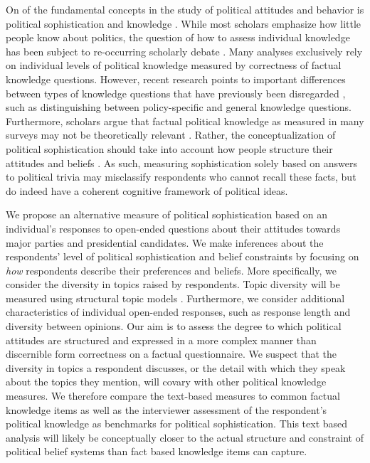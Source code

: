 \documentclass[12pt]{article}
\begin{document}
On of the fundamental concepts in the study of political attitudes and behavior is political sophistication and knowledge \citep{converse1964nature,carpini1996americans}. While most scholars emphasize how little people know about politics, the question of how to assess individual knowledge has been subject to re-occurring scholarly debate \citep[e.g.][]{mondak2000reconsidering,mondak2001asked,sturgis2008experiment,debell2013harder,pietryka2013analysis}. Many analyses exclusively rely on individual levels of political knowledge measured by correctness of factual knowledge questions. However, recent research points to important differences between types of knowledge questions that have previously been disregarded \citep{barabas2014question}, such as distinguishing between policy-specific and general knowledge questions. Furthermore, scholars argue that factual political knowledge as measured in many surveys may not be theoretically relevant \citep[e.g., the question writer and respondent have differing world-views]{lupia2006elitism}. Rather, the conceptualization of political sophistication should take into account how people structure their attitudes and beliefs \citep[e.g.][]{luskin1987measuring}. As such, measuring sophistication solely based on answers to political trivia may misclassify respondents who cannot recall these facts, but do indeed have a coherent cognitive framework of political ideas.

We propose an alternative measure of political sophistication based on an individual's responses to open-ended questions about their attitudes towards major parties and presidential candidates. We make inferences about the respondents' level of political sophistication and belief constraints by focusing on \textit{how} respondents describe their preferences and beliefs. More specifically, we consider the diversity in topics raised by respondents. Topic diversity will be measured using structural topic models \citep{roberts2014structural}. Furthermore, we consider additional characteristics of individual open-ended responses, such as response length and diversity between opinions. Our aim is to assess the degree to which political attitudes are structured and expressed in a more complex manner than discernible form correctness on a factual questionnaire. We suspect that the diversity in topics a respondent discusses, or the detail with which they speak about the topics they mention, will covary with other political knowledge measures. We therefore compare the text-based measures to common factual knowledge items as well as the interviewer assessment of the respondent's political knowledge as benchmarks for political sophistication. This text based analysis will likely be conceptually closer to the actual structure and constraint of political belief systems \citep[see for example][]{tetlock1983cognitive,luskin1987measuring} than fact based knowledge items can capture.
\end{document}
